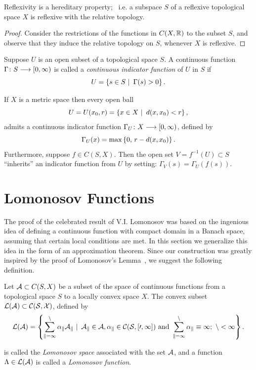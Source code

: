\begin{prop}
Reflexivity is a hereditary property; \, i.e. a subspace $S$ of
a reflexive topological space $X$ is reflexive with the
relative topology.
\end{prop}

\begin{proof}
Consider the restrictions of the functions in $C(X,\mathbb R)$ to
the subset $S$, and observe that they induce the relative
topology on $S$, whenever $X$ is reflexive.
\end{proof}

\begin{defn}
Suppose $U$ is an open subset of a topological space $S$. A
continuous function $\Gamma\colon S \longrightarrow [0,\infty)$ is called a
{\em continuous indicator function} of $U$ in $S$ if
\[ U = \left\{s\in S \,\,|\,\,\, \Gamma(s) > 0\right\}.  \]
\end{defn}

\begin{rem}
If $X$ is a metric space then every open ball
\[ U=U(x_0,r)=\left\{x\in X \,\,|\,\,\, d(x,x_0) < r\right\}, \]
admits a continuous indicator function
$\Gamma_U\colon{X}\longrightarrow[0,\infty)$, defined by
\[ \Gamma_U(x) = \max\left\{0, \, r - d(x,x_0) \right\}. \]
Furthermore, suppose $f \in C(S,X)$. Then the open set
$V=f^{-1}(U)\subset S$ ``inherits'' an indicator function from
$U$ by setting: $\Gamma_V(s)=\Gamma_U(f(s))$.
\end{rem}

\smallskip
\goodbreak


\goodbreak
\section{Lomonosov Functions}

The proof of the celebrated result of V.I. Lomonosov
\citep{Lom73,RR73} was based on the ingenious idea of defining a
continuous function with compact domain in a Banach space,
assuming that certain local conditions are met. In this section
we generalize this idea in the form of an approximation
theorem. Since our construction was greatly inspired by the
proof of Lomonosov's Lemma~\citep{Lom73,RR73}, we suggest the
following definition.

\begin{defn}
Let ${\cal A} \subset C(S,X)$ be a subset of the space of continuous
functions from a topological space $S$ to a locally convex
space $X$. The convex subset $\cal{L}({\cal A}) \subset C(S,X)$,
defined by
\[ \cal{L}({\cal A}) = \left\{ \sum_{k=1}^n \alpha_k A_k \,\,|\,\,\, A_k\in{\cal A},
   \alpha_k\in C(S,[0,1]) \text{ and } \sum_{k=1}^n\alpha_k \equiv 1;
   \,\, n < \infty\right\}. \]

is called the {\em Lomonosov space} associated with the set
${\cal A}$, and a function $\Lambda \in \cal{L}({\cal A})$ is called a {\em
Lomonosov function}.
\end{defn}

